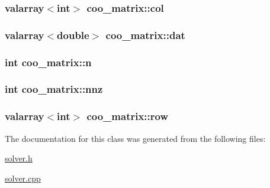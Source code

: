 \subsubsection[{col}]{\setlength{\rightskip}{0pt plus 5cm}valarray$<$int$>$ coo\+\_\+matrix\+::col}\hypertarget{classcoo__matrix_ae49b54893e4b096df04e9b6a5ce02923}{}\label{classcoo__matrix_ae49b54893e4b096df04e9b6a5ce02923}
\subsubsection[{dat}]{\setlength{\rightskip}{0pt plus 5cm}valarray$<$double$>$ coo\+\_\+matrix\+::dat}\hypertarget{classcoo__matrix_ab819a816424fa585d028739b5318959a}{}\label{classcoo__matrix_ab819a816424fa585d028739b5318959a}
\subsubsection[{n}]{\setlength{\rightskip}{0pt plus 5cm}int coo\+\_\+matrix\+::n}\hypertarget{classcoo__matrix_a6148ebf053576f70747dc3e260f25ea5}{}\label{classcoo__matrix_a6148ebf053576f70747dc3e260f25ea5}
\subsubsection[{nnz}]{\setlength{\rightskip}{0pt plus 5cm}int coo\+\_\+matrix\+::nnz}\hypertarget{classcoo__matrix_a52ecd103d6c673a7e26457d29055fb3c}{}\label{classcoo__matrix_a52ecd103d6c673a7e26457d29055fb3c}
\subsubsection[{row}]{\setlength{\rightskip}{0pt plus 5cm}valarray$<$int$>$ coo\+\_\+matrix\+::row}\hypertarget{classcoo__matrix_ad1e40669007eeeedcad75eb5606df654}{}\label{classcoo__matrix_ad1e40669007eeeedcad75eb5606df654}


The documentation for this class was generated from the following files\+:\begin{DoxyCompactItemize}
\item 
\hyperlink{solver_8h}{solver.\+h}\item 
\hyperlink{solver_8cpp}{solver.\+cpp}\end{DoxyCompactItemize}
